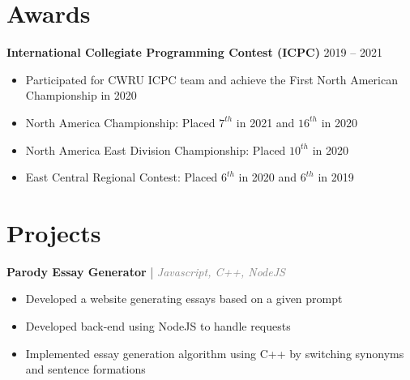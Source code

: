 \documentclass[11pt]{article}
\begin{document}
\section{Awards}
\hspace{10pt}\textbf{International Collegiate Programming Contest (ICPC)} \hfill {\small 2019 -- 2021}

\begin{itemize}[leftmargin=31pt]
\vspace{-10pt}
\setlength\itemsep{-5pt}
    \item {\small Participated for CWRU ICPC team and achieve the First North American Championship in 2020}
    \item {\small North America Championship: Placed $7^{th}$ in 2021 and $16^{th}$ in 2020}
    \item {\small North America East Division Championship: Placed $10^{th}$ in 2020}
    \item {\small East Central Regional Contest: Placed $6^{th}$ in 2020 and $6^{th}$ in 2019}
    \vspace{-7pt}
\end{itemize}

\section{Projects}

\hspace{10pt}\textbf{Parody Essay Generator} {\small | \textit{\textcolor{gray}{Javascript, C++, NodeJS}}} \hfill {\small \href{http://vaodoan.herokuapp.com/}{\faGlobe}}
  \begin{itemize}[leftmargin=31pt]
  \vspace{-10pt}
    \setlength\itemsep{-5pt}
      \item {\small Developed a website generating essays based on a given prompt}
      \item {\small Developed back-end using NodeJS to handle requests}
      \item {\small Implemented essay generation algorithm using C++ by switching synonyms and sentence formations}
      \vspace{-5pt}
  \end{itemize}

\end{document}
